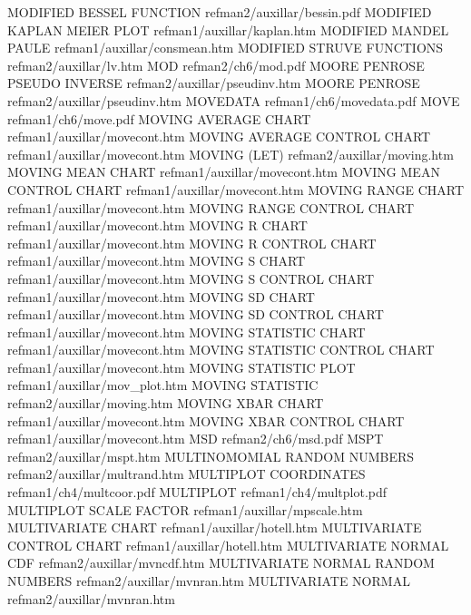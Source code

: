 MODIFIED BESSEL FUNCTION                refman2/auxillar/bessin.pdf
MODIFIED KAPLAN MEIER PLOT              refman1/auxillar/kaplan.htm
MODIFIED MANDEL PAULE                   refman1/auxillar/consmean.htm
MODIFIED STRUVE FUNCTIONS               refman2/auxillar/lv.htm
MOD                                     refman2/ch6/mod.pdf
MOORE PENROSE PSEUDO INVERSE            refman2/auxillar/pseudinv.htm
MOORE PENROSE                           refman2/auxillar/pseudinv.htm
MOVEDATA                                refman1/ch6/movedata.pdf
MOVE                                    refman1/ch6/move.pdf
MOVING AVERAGE CHART                    refman1/auxillar/movecont.htm
MOVING AVERAGE CONTROL CHART            refman1/auxillar/movecont.htm
MOVING (LET)                            refman2/auxillar/moving.htm
MOVING MEAN CHART                       refman1/auxillar/movecont.htm
MOVING MEAN CONTROL CHART               refman1/auxillar/movecont.htm
MOVING RANGE CHART                      refman1/auxillar/movecont.htm
MOVING RANGE CONTROL CHART              refman1/auxillar/movecont.htm
MOVING R CHART                          refman1/auxillar/movecont.htm
MOVING R CONTROL CHART                  refman1/auxillar/movecont.htm
MOVING S CHART                          refman1/auxillar/movecont.htm
MOVING S CONTROL CHART                  refman1/auxillar/movecont.htm
MOVING SD CHART                         refman1/auxillar/movecont.htm
MOVING SD CONTROL CHART                 refman1/auxillar/movecont.htm
MOVING STATISTIC CHART                  refman1/auxillar/movecont.htm
MOVING STATISTIC CONTROL CHART          refman1/auxillar/movecont.htm
MOVING STATISTIC PLOT                   refman1/auxillar/mov_plot.htm
MOVING STATISTIC                        refman2/auxillar/moving.htm
MOVING XBAR CHART                       refman1/auxillar/movecont.htm
MOVING XBAR CONTROL CHART               refman1/auxillar/movecont.htm
MSD                                     refman2/ch6/msd.pdf
MSPT                                    refman2/auxillar/mspt.htm
MULTINOMOMIAL RANDOM NUMBERS            refman2/auxillar/multrand.htm
MULTIPLOT COORDINATES                   refman1/ch4/multcoor.pdf
MULTIPLOT                               refman1/ch4/multplot.pdf
MULTIPLOT SCALE FACTOR                  refman1/auxillar/mpscale.htm
MULTIVARIATE CHART                      refman1/auxillar/hotell.htm
MULTIVARIATE CONTROL CHART              refman1/auxillar/hotell.htm
MULTIVARIATE NORMAL CDF                 refman2/auxillar/mvncdf.htm
MULTIVARIATE NORMAL RANDOM NUMBERS      refman2/auxillar/mvnran.htm
MULTIVARIATE NORMAL                     refman2/auxillar/mvnran.htm
